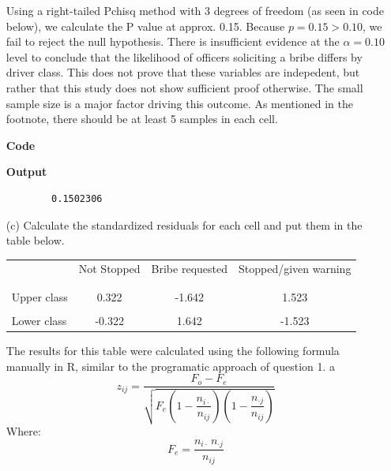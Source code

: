 \documentclass[12pt,letterpaper]{article}
\begin{document}
\begin{enumerate}
	Using a right-tailed Pchisq method with 3 degrees of freedom (as seen in code below), we calculate the P value at approx. 0.15. Because $p = 0.15 > 0.10$, we fail to reject the null hypothesis. There is insufficient evidence at the $\alpha = 0.10$ level to conclude that the likelihood of officers soliciting a bribe differs by driver class. This does not prove that these variables are indepedent, but rather that this study does not show sufficient proof otherwise. The small sample size is a major factor driving this outcome. As mentioned in the footnote, there should be at least 5 samples in each cell.
	\vspace{1cm}

	\textbf{Code}
    
	\vspace{1cm}
    \textbf{Output}
	\begin{verbatim}
        0.1502306
	\end{verbatim}
	
	\newpage
	\item [(c)] Calculate the standardized residuals for each cell and put them in the table below.
	\vspace{1cm}
	
	\begin{table}[h]
		\centering
		\begin{tabular}{l | c c c }
			& Not Stopped & Bribe requested & Stopped/given warning \\
			\\[-1.8ex] 
			\hline \\[-1.8ex]
			Upper class  &0.322  &-1.642  &1.523 \\
			\\
			Lower class &-0.322  &1.642   &-1.523  \\
			
		\end{tabular}
	\end{table}
	\vspace{1cm}
	The results for this table were calculated using the following formula manually in R, similar to the programatic approach of question 1. a
	\vspace{.5cm}
		\[
		z_{ij} = \frac{F_o - F_e}{\sqrt{F_e\left(1 - \dfrac{n_{i\cdot}}{n_{ij}}\right)\left(1 - \dfrac{n_{\cdot j}}{n_{ij}}\right)}}
		\]
		Where:
		\vspace{.5cm}
		\[ 
		F_e = \frac{n_{i\cdot}\, n_{\cdot j}}{n_{ij}}
		\] 
	\vspace{.5cm}


\end{enumerate}
\end{document}
